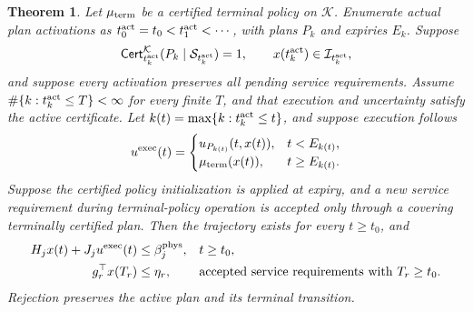 \documentclass[preprint,12pt]{elsarticle}
\theoremstyle{definition}
\theoremstyle{plain}
\newtheorem{theorem}{Theorem}
\theoremstyle{definition}
\theoremstyle{plain}
\begin{document}
\begin{theorem}
\label{thm:backup-recursive-availability}
Let $\mu_{\rm term}$ be a certified terminal policy on $\mathcal K$. Enumerate
actual plan activations as $t_0^{\rm act}=t_0<t_1^{\rm act}<\cdots$,
with plans $P_k$ and expiries $E_k$. Suppose
\[
\mathsf{Cert}^{\mathcal K}_{t_k^{\rm act}}
 (P_k\mid\mathcal S_{t_k^{\rm act}})=1,\qquad
x(t_k^{\rm act})\in\mathcal I_{t_k^{\rm act}},
\]
and suppose every activation preserves all pending service requirements.
Assume $\#\{k:t_k^{\rm act}\le T\}<\infty$ for every finite $T$, and
that execution and uncertainty satisfy the active certificate. Let $k(t)=\max\{k:t_k^{\rm act}\le t\}$, and suppose execution follows
\begin{equation}
u^{\rm exec}(t)=\begin{cases}
u_{P_{k(t)}}(t,x(t)),&t<E_{k(t)},\\
\mu_{\rm term}(x(t)),&t\ge E_{k(t)}.
\end{cases}
\label{eq:terminal-execution-policy}
\end{equation}
Suppose the certified policy initialization is applied at expiry, and
a new service requirement during terminal-policy operation is accepted
only through a covering terminally certified plan. Then the trajectory exists for every $t\ge t_0$, and
\begin{equation}
\begin{aligned}
H_jx(t)+J_ju^{\rm exec}(t)&\le\beta_j^{\rm phys},
 &&t\ge t_0,\\
g_r^\top x(T_r)&\le\eta_r,
 &&\text{accepted service requirements with }T_r\ge t_0.
\end{aligned}
\label{eq:terminal-global-guarantee}
\end{equation}
Rejection preserves the active plan and its terminal transition.
\end{theorem}
\end{document}
